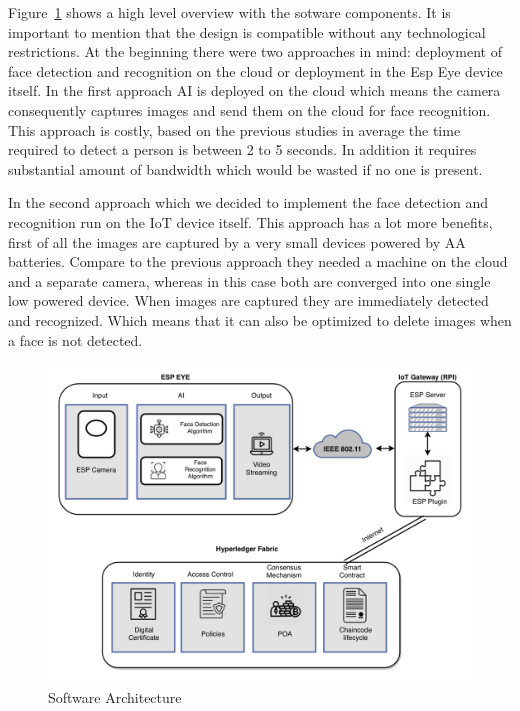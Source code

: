 Figure~\ref{fig:surveillance2} shows a high level overview with the sotware components. It is important to mention that the design is compatible without any technological restrictions. At the beginning there were two approaches in mind: deployment of face detection and recognition on the cloud or deployment in the Esp Eye device itself. In the first approach AI is deployed on the cloud which means the camera consequently captures images and send them on the cloud for face recognition. This approach is costly, based on the previous studies in average the time required to detect a person is between 2 to 5 seconds. In addition it requires substantial amount of bandwidth which would be wasted if no one is present.

In the second approach which we decided to implement the face detection and recognition run on the IoT device itself. This approach has a lot more benefits, first of all the images are captured by a very small devices powered by AA batteries. Compare to the previous approach they needed a machine on the cloud and a separate camera, whereas in this case both are converged into one single low powered device. When images are captured they are immediately detected and recognized. Which means that it can also be optimized to delete images when a face is not detected. 



\begin{figure}[!htb]
    \centering
    \includegraphics[width=1\textwidth]{figures/esp2.png}
    \caption{Software Architecture}
    \label{fig:surveillance2}
\end{figure}



